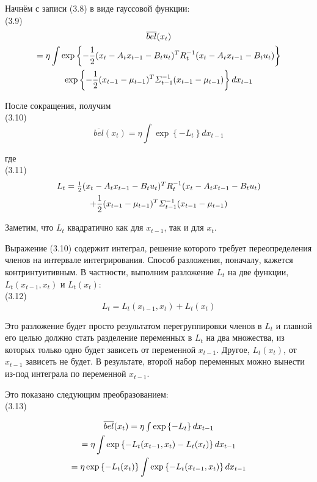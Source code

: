 \documentclass[10pt,a4paper]{article}
\begin{document}
Начнём с записи (3.8) в виде гауссовой функции:\\

(3.9)
\begin{multline*}
$$\overline{bel}(x_t)\\=\eta \int \exp\left\lbrace -\frac{1}{2}(x_t-A_t x_{t-1}-B_t u_t)^T R_t^{-1}(x_t-A_t x_{t-1}-B_t u_t)\right\rbrace\\ \exp\left\lbrace -\frac{1}{2}(x_{t-1}-\mu_{t-1})^T \varSigma_{t-1}^{-1}(x_{t-1}-\mu_{t-1})\right\rbrace dx_{t-1}$$ 
\end{multline*}

После сокращения, получим\\

(3.10)
$$\overline{bel}(x_t)=\eta \int \exp\left\lbrace -L_t\right\rbrace dx_{t-1}$$ 

где\\

(3.11)
\begin{multline*}
$$L_t=\frac{1}{2}(x_t-A_t x_{t-1}-B_t u_t)^T R_t^{-1}(x_t-A_t x_{t-1}-B_t u_t)\\ +\frac{1}{2}(x_{t-1}-\mu_{t-1})^T \varSigma_{t-1}^{-1}(x_{t-1}-\mu_{t-1})$$ \end{multline*}

Заметим, что $L_t$ квадратично как для $x_{t-1}$, так и для $x_t$.

Выражение (3.10) содержит интеграл, решение которого требует переопределения членов на интервале интегрирования. Способ разложения, поначалу, кажется контринтуитивным. В частности,  выполним разложение $L_t$ на две функции, $L_t(x_{t-1}, x_t)$ и $L_t(x_t)$:\\

(3.12)
$$L_t=L_t(x_{t-1},x_t)+L_t(x_t)$$

Это разложение будет просто результатом перегруппировки членов в $L_t$ и главной его целью  должно стать разделение переменных в $L_t$ на два множества, из которых только одно будет зависеть от переменной $x_{t-1}$. Другое, $L_t(x_t)$, от $x_{t-1}$ зависеть не будет. В результате, второй набор переменных можно вынести из-под интеграла по переменной $x_{t-1}$.

Это показано следующим преобразованием:\\

(3.13)
 
\begin{multline*}
$$\overline{bel}(x_t)=\eta\int\exp\left\lbrace -L_t\right\rbrace dx_{t-1}\\ 
=\eta\int\exp\left\lbrace-L_t(x_{t-1},x_t)-L_t(x_t)\right\rbrace dx_{t-1}\\ =\eta  \exp\left\lbrace -L_t(x_t)\right\rbrace\int\exp\left\lbrace -L_t(x_{t-1},x_t)\right\rbrace dx_{t-1}$$ 
\end{multline*}
\end{document}

